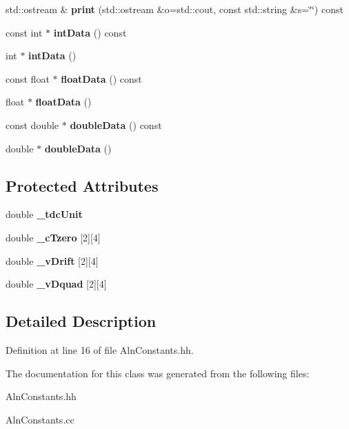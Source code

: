\begin{DoxyCompactItemize}
\item 
std::ostream \& {\bfseries print} (std::ostream \&o=std::cout, const std::string \&s=\char`\"{}\char`\"{}) const \label{classTBTrack_1_1AlnConstants_aa01bb46450b492761c90392eb81411bc}

\item 
const int $\ast$ {\bfseries intData} () const \label{classTBTrack_1_1AlnConstants_afb793481bc8c9ea4786e9e52144cb708}

\item 
int $\ast$ {\bfseries intData} ()\label{classTBTrack_1_1AlnConstants_a5ffc45d080fe15974fca534ae01c3146}

\item 
const float $\ast$ {\bfseries floatData} () const \label{classTBTrack_1_1AlnConstants_a2d50c758aa6c1a6bbfa4790d7c1d1ed1}

\item 
float $\ast$ {\bfseries floatData} ()\label{classTBTrack_1_1AlnConstants_a48b746d9e7043bd80d2968bed18f21ef}

\item 
const double $\ast$ {\bfseries doubleData} () const \label{classTBTrack_1_1AlnConstants_afd83d2588465d22b8ef17cb39326ee5b}

\item 
double $\ast$ {\bfseries doubleData} ()\label{classTBTrack_1_1AlnConstants_aa07f0bb0b3cdde7eb56afa7050e626d9}

\end{DoxyCompactItemize}
\subsection*{Protected Attributes}
\begin{DoxyCompactItemize}
\item 
double {\bfseries \_\-tdcUnit}\label{classTBTrack_1_1AlnConstants_a2cf1c1f9615a86de4d37f9a72ff0292b}

\item 
double {\bfseries \_\-cTzero} [2][4]\label{classTBTrack_1_1AlnConstants_af55cc6424803c2d11d027bcec1b64f82}

\item 
double {\bfseries \_\-vDrift} [2][4]\label{classTBTrack_1_1AlnConstants_a31dab51bbeacb52b53f8d1bc2cd2466a}

\item 
double {\bfseries \_\-vDquad} [2][4]\label{classTBTrack_1_1AlnConstants_a91b9a4fcb791b1a3aeade9408633bbcf}

\end{DoxyCompactItemize}


\subsection{Detailed Description}


Definition at line 16 of file AlnConstants.hh.

The documentation for this class was generated from the following files:\begin{DoxyCompactItemize}
\item 
AlnConstants.hh\item 
AlnConstants.cc\end{DoxyCompactItemize}
